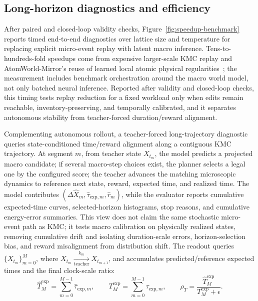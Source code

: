 \documentclass{article}
\begin{document}
\subsection{Long-horizon diagnostics and efficiency}
After paired and closed-loop validity checks, Figure~\ref{fig:speedup-benchmark} reports timed end-to-end diagnostics over lattice size and temperature for replacing explicit micro-event replay with latent macro inference. Tens-to-hundreds-fold speedups come from expensive larger-scale KMC replay and AtomWorld-Mirror's reuse of learned local atomic physical regularities~\cite{plimpton1995fast,thompson2022lammps,li2019openkmc,zhang2018deeppotential,wang2018deepmdkit,batzner2022nequip,musaelian2023allegro}; the measurement includes benchmark orchestration around the macro world model, not only batched neural inference. Reported after validity and closed-loop checks, this timing tests replay reduction for a fixed workload only when edits remain reachable, inventory-preserving, and temporally calibrated, and it separates autonomous stability from teacher-forced duration/reward alignment.

Complementing autonomous rollout, a teacher-forced long-trajectory diagnostic queries state-conditioned time/reward alignment along a contiguous KMC trajectory. At segment $m$, from teacher state $X_{t_m}$, the model predicts a projected macro candidate; if several macro-step choices exist, the planner selects a legal one by the configured score; the teacher advances the matching microscopic dynamics to reference next state, reward, expected time, and realized time. The model contributes $(\Delta\hat{X}_m,\hat{\tau}_{\mathrm{exp},m},\hat{r}_m)$, while the evaluator reports cumulative expected-time curves, selected-horizon histograms, stop reasons, and cumulative energy-error summaries. This view does not claim the same stochastic micro-event path as KMC; it tests macro calibration on physically realized states, removing cumulative drift and isolating duration-scale errors, horizon-selection bias, and reward misalignment from distribution shift. The readout queries \(\{X_{t_m}\}_{m=0}^{M}\), where \(X_{t_m}\xrightarrow[\mathrm{teacher}]{k_m}X_{t_{m+1}}\), and accumulates predicted/reference expected times and the final clock-scale ratio:
\begin{equation}
\hat{T}^{\mathrm{exp}}_M=\sum_{m=0}^{M-1}\hat{\tau}_{\mathrm{exp},m},
\qquad
T^{\mathrm{exp}}_M=\sum_{m=0}^{M-1}\tau_{\mathrm{exp},m},
\qquad
\rho_T=\frac{\hat{T}^{\mathrm{exp}}_M}{T^{\mathrm{exp}}_M+\epsilon}.
\label{eq:teacher-forced-time-ratio}
\end{equation}
\end{document}
